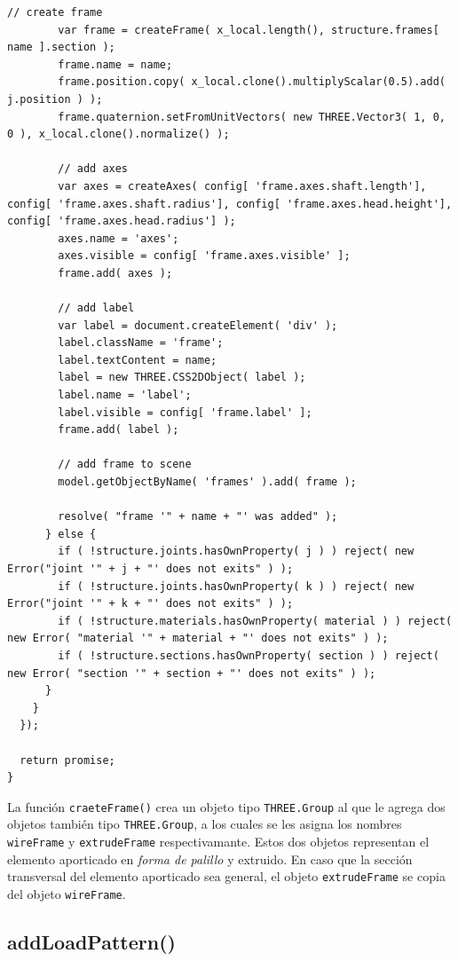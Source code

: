 \begin{lstlisting}[language={},caption=Función \texttt{addFrame()} implementada en el archivo \texttt{FEM.js}.,label=alg:FEM.js-addFrame, frame=single]
        // create frame
        var frame = createFrame( x_local.length(), structure.frames[ name ].section );
        frame.name = name;
        frame.position.copy( x_local.clone().multiplyScalar(0.5).add( j.position ) );
        frame.quaternion.setFromUnitVectors( new THREE.Vector3( 1, 0, 0 ), x_local.clone().normalize() );
    
        // add axes
        var axes = createAxes( config[ 'frame.axes.shaft.length'], config[ 'frame.axes.shaft.radius'], config[ 'frame.axes.head.height'], config[ 'frame.axes.head.radius'] );
        axes.name = 'axes';
        axes.visible = config[ 'frame.axes.visible' ];
        frame.add( axes );
    
        // add label
        var label = document.createElement( 'div' );
        label.className = 'frame';
        label.textContent = name;
        label = new THREE.CSS2DObject( label );
        label.name = 'label';
        label.visible = config[ 'frame.label' ];
        frame.add( label );
        
        // add frame to scene
        model.getObjectByName( 'frames' ).add( frame );
      
        resolve( "frame '" + name + "' was added" );
      } else {
        if ( !structure.joints.hasOwnProperty( j ) ) reject( new Error("joint '" + j + "' does not exits" ) );
        if ( !structure.joints.hasOwnProperty( k ) ) reject( new Error("joint '" + k + "' does not exits" ) );
        if ( !structure.materials.hasOwnProperty( material ) ) reject( new Error( "material '" + material + "' does not exits" ) );
        if ( !structure.sections.hasOwnProperty( section ) ) reject( new Error( "section '" + section + "' does not exits" ) );
      }
    }
  });

  return promise;
}
\end{lstlisting}
\bigskip

La función \verb|craeteFrame()| crea un objeto tipo \verb|THREE.Group| al que le agrega dos objetos también tipo \verb|THREE.Group|, a los cuales se les asigna los nombres \verb|wireFrame| y \verb|extrudeFrame| respectivamante. Estos dos objetos representan el elemento aporticado en \emph{forma de palillo} y extruido. En caso que la sección transversal del elemento aporticado sea general, el objeto \verb|extrudeFrame| se copia del objeto \verb|wireFrame|.\\

\subsection{addLoadPattern()}

